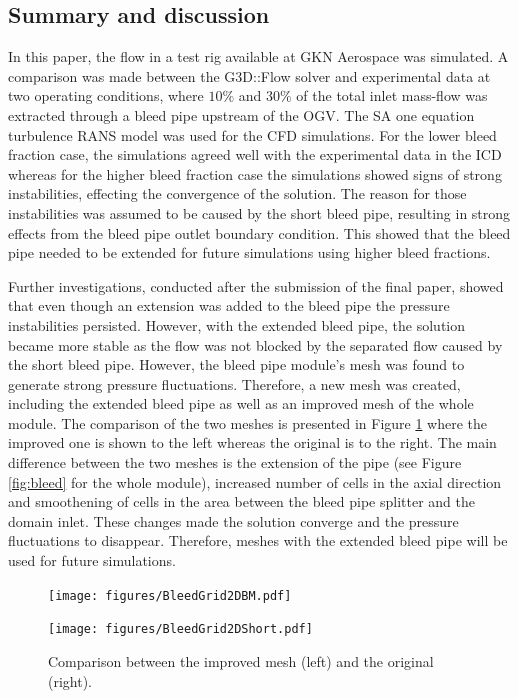 \subsection{Summary and discussion}
In this paper, the flow in a test rig available at GKN Aerospace was simulated. A comparison was made between the G3D::Flow solver and experimental data at two operating conditions, where $10\%$ and $30\%$ of the total inlet mass-flow was extracted through a bleed pipe upstream of the OGV. The SA one equation turbulence RANS model was used for the CFD simulations. For the lower bleed fraction case, the simulations agreed well with the experimental data in the ICD whereas for the higher bleed fraction case the simulations showed signs of strong instabilities, effecting the convergence of the solution. The reason for those instabilities was assumed to be caused by the short bleed pipe, resulting in strong effects from the bleed pipe outlet boundary condition. This showed that the bleed pipe needed to be extended for future simulations using higher bleed fractions.

Further investigations, conducted after the submission of the final paper, showed that even though an extension was added to the bleed pipe the pressure instabilities persisted. However, with the extended bleed pipe, the solution became more stable as the flow was not blocked by the separated flow caused by the short bleed pipe. However, the bleed pipe module's mesh was found to generate strong pressure fluctuations. Therefore, a new mesh was created, including the extended bleed pipe as well as an improved mesh of the whole module. The comparison of the two meshes is presented in Figure \ref{fig:BleedComp} where the improved one is shown to the left whereas the original is to the right. The main difference between the two meshes is the extension of the pipe (see Figure \ref{fig:bleed} for the whole module), increased number of cells in the axial direction and smoothening of cells in the area between the bleed pipe splitter and the domain inlet. These changes made the solution converge and the pressure fluctuations to disappear. Therefore, meshes with the extended bleed pipe will be used for future simulations.
\begin{figure}[H]
  \centering
  \begin{minipage}{0.49\columnwidth}
  \texttt{[image: figures/BleedGrid2DBM.pdf]}
  \end{minipage}
  \begin{minipage}{0.49\columnwidth}
  \texttt{[image: figures/BleedGrid2DShort.pdf]}
  \end{minipage}
    \caption{Comparison between the improved mesh (left) and the original (right).}\label{fig:BleedComp}
\end{figure}



